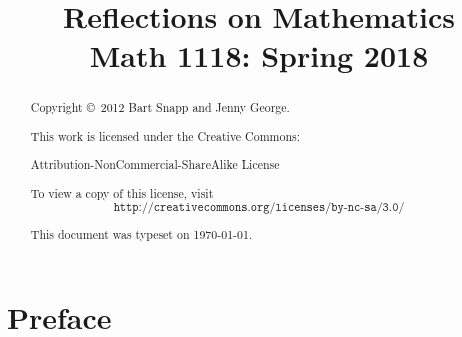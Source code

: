 


\title{
\textbf{\textsf{
\Huge Reflections on Mathematics \\
\Large Math 1118: Spring 2018
}}}
\author{}
\date{}
\maketitle



\begin{abstract}
Copyright \copyright~2012 Bart Snapp and Jenny George.

\vspace{.5cm}

\noindent
This work is licensed under the Creative Commons:
\begin{center}
Attribution-NonCommercial-ShareAlike License 
\end{center}
To view a copy of this license, visit
\[
\texttt{http://creativecommons.org/licenses/by-nc-sa/3.0/}
\]

\vspace{.5cm}

\noindent This document was typeset on \today.

\end{abstract}



\chapter*{Preface}


